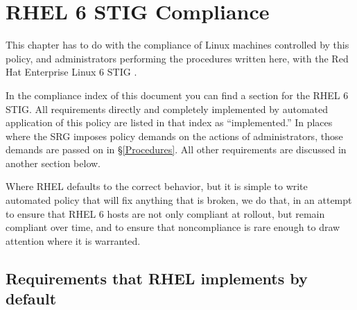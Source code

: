
\chapter{RHEL 6 STIG Compliance}
\label{RHEL6STIGCompliance}

This chapter has to do with the compliance of Linux machines controlled by
this policy, and administrators performing the procedures written here,
with the Red Hat Enterprise Linux 6 STIG \cite{rhel6-stig}.

In the compliance index of this document you can find a section for the RHEL 6 STIG.
All requirements directly and completely implemented by automated
application of this policy are listed in that index as ``implemented.''
In places where the SRG imposes
policy demands on the actions of administrators, those demands are passed
on in \S\ref{Procedures}. All other requirements are discussed in another
section below.

Where RHEL defaults to the correct behavior, but it is simple to write
automated policy that will fix anything that is broken, we do that, in an
attempt to ensure that RHEL 6 hosts are not only compliant at rollout, but
remain compliant over time, and to ensure that noncompliance is rare
enough to draw attention where it is warranted.






\section{Requirements that RHEL implements by default}




